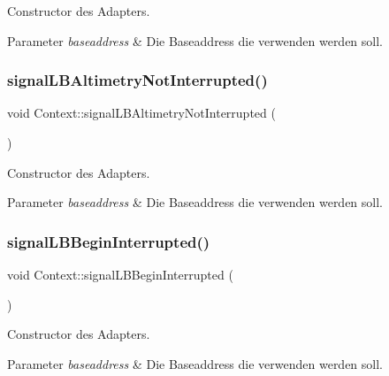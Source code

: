 Constructor des Adapters.


\begin{DoxyParams}{Parameter}
{\em baseaddress} & Die Baseaddress die verwenden werden soll. \\
\hline
\end{DoxyParams}
\hypertarget{class_context_acf97db4d70e7246a1d06e4166ece5de5}{}\label{class_context_acf97db4d70e7246a1d06e4166ece5de5} 
\subsubsection{\texorpdfstring{signal\+L\+B\+Altimetry\+Not\+Interrupted()}{signalLBAltimetryNotInterrupted()}\hspace{0.1cm}{\footnotesize\ttfamily [2/2]}}
{\footnotesize\ttfamily void Context\+::signal\+L\+B\+Altimetry\+Not\+Interrupted (\begin{DoxyParamCaption}{ }\end{DoxyParamCaption})}

Constructor des Adapters.


\begin{DoxyParams}{Parameter}
{\em baseaddress} & Die Baseaddress die verwenden werden soll. \\
\hline
\end{DoxyParams}
\hypertarget{class_context_a08df75859b851d2eca2d8e379214d6b5}{}\label{class_context_a08df75859b851d2eca2d8e379214d6b5} 
\subsubsection{\texorpdfstring{signal\+L\+B\+Begin\+Interrupted()}{signalLBBeginInterrupted()}\hspace{0.1cm}{\footnotesize\ttfamily [1/2]}}
{\footnotesize\ttfamily void Context\+::signal\+L\+B\+Begin\+Interrupted (\begin{DoxyParamCaption}{ }\end{DoxyParamCaption})}

Constructor des Adapters.


\begin{DoxyParams}{Parameter}
{\em baseaddress} & Die Baseaddress die verwenden werden soll. \\
\hline
\end{DoxyParams}
\hypertarget{class_context_a08df75859b851d2eca2d8e379214d6b5}{}\label{class_context_a08df75859b851d2eca2d8e379214d6b5} 
